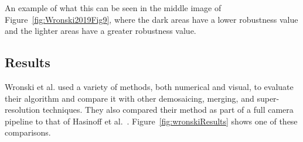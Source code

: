 \documentclass{sig-alternate}
\begin{document}
An example of what this can be seen in the middle image of Figure~\ref{fig:Wronski2019Fig9}, where the dark areas have a lower robustness value and the lighter areas have a greater robustness value.






\subsection{Results}



Wronski et al. used a variety of methods, both numerical and visual, to evaluate their algorithm and compare it with other demosaicing, merging, and super-resolution techniques. They also compared their method as part of a full camera pipeline to that of Hasinoff et al.~\cite{Hasinoff2016}. Figure~\ref{fig:wronskiResults} shows one of these comparisons.
\end{document}
